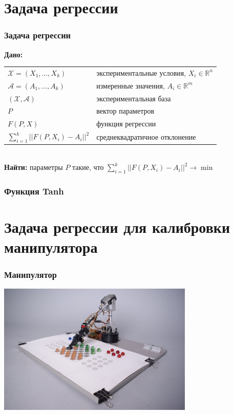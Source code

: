 \documentclass[24pt,pdf,hyperref={unicode},aspectratio=169]{beamer}
\begin{document}
\section{Задача регрессии}

\begin{frame}\frametitle{Задача регрессии}
{\bf Дано:}

\begin{tabular}{p{4cm} p{7cm}}
 $\mathcal{X}=(X_1,\ldots,X_k)$ & экспериментальные условия, $X_i\in\mathbb{R}^n$\\[0.1cm]
 $\mathcal{A}=(A_1,\ldots,A_k)$ & измеренные значения, $A_i\in\mathbb{R}^m$\\[0.1cm]
 $(\mathcal{X},\mathcal{A})$ & экспериментальная база \\[0.1cm]
 $P$ & вектор параметров \\[0.1cm]
 $F(P,X)$ & функция регрессии \\[0.1cm]
 $\sum_{i=1}^{k} ||F(P,X_i)-A_i||^2 $ & среднеквадратичное отклонение\\
 \end{tabular}\\[1cm]
 {\bf Найти:}
 параметры $P$ такие, что $\sum_{i=1}^{k} ||F(P,X_i)-A_i||^2 \rightarrow \min$
\end{frame}

\begin{frame}\frametitle{Функция Tanh}
\end{frame}



\section{Задача регрессии для калибровки манипулятора}

\begin{frame}\frametitle{Манипулятор}
\begin{center}
\includegraphics[width=0.7\textwidth]{Images/Joseph.jpg}
\end{center}
\end{frame}
\end{document}
